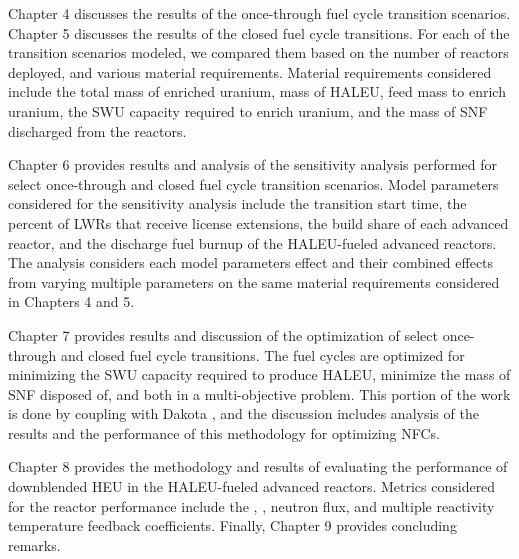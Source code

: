Chapter 4 discusses the results of the 
once-through fuel cycle transition scenarios. Chapter 5 discusses the 
results of the closed fuel cycle transitions. For each of the transition 
scenarios modeled, we compared them based on the number of reactors 
deployed, and various material requirements. Material requirements 
considered include the total mass of enriched uranium, mass of \gls{HALEU}, 
feed mass to enrich uranium, the \gls{SWU} capacity required to enrich 
uranium, and the mass of \gls{SNF} discharged from the reactors. 

Chapter 6 provides results 
and analysis of the sensitivity analysis performed for select once-through 
and closed fuel cycle transition scenarios. Model parameters considered 
for the sensitivity analysis include the transition start time, 
the percent of \glspl{LWR} that receive license extensions, the build share 
of each advanced reactor, and the discharge fuel burnup of the 
\gls{HALEU}-fueled advanced reactors. The analysis considers each model 
parameters effect and their combined effects from varying multiple 
parameters on the same material requirements considered in Chapters 4 and 5.


Chapter 7 provides 
results and discussion of the optimization of select once-through and 
closed fuel cycle transitions. The fuel cycles are optimized for minimizing 
the \gls{SWU} capacity required to produce \gls{HALEU}, minimize the 
mass of \gls{SNF} disposed of, and both in a multi-objective problem. This 
portion of the work is done by coupling \Cyclus with Dakota 
\cite{adams_dakota_2021}, and the discussion includes analysis of the results 
and the performance of this methodology for optimizing \glspl{NFC}. 

Chapter 8 provides the methodology and 
results of evaluating the performance of downblended \gls{HEU} in 
the \gls{HALEU}-fueled advanced reactors. Metrics considered for the 
reactor performance include the \keff, \betaEff, neutron flux, 
and multiple reactivity temperature feedback coefficients. 
Finally, Chapter 9 provides concluding remarks. 